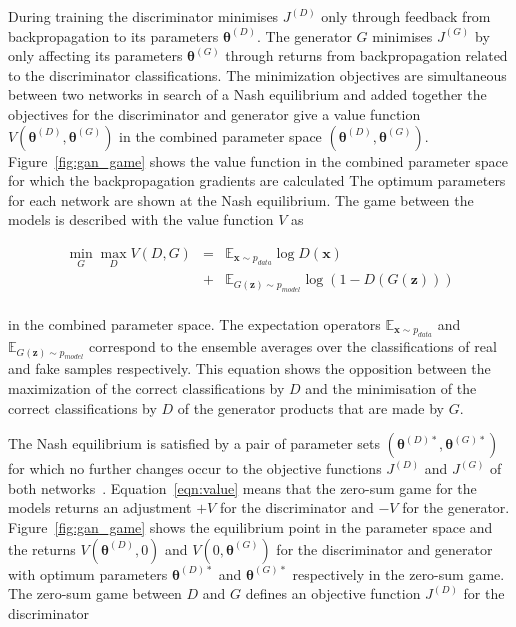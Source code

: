 \documentclass[twocolumn]{article}
\numberwithin{equation}{section}
\begin{document}
During training the discriminator minimises $J^{(D)}$ only through feedback from backpropagation to its parameters 
$\bm{\theta}^{(D)}$. The generator $G$ minimises $J^{(G)}$ by only affecting its parameters $\bm{\theta}^{(G)}$ through 
returns from backpropagation related to the discriminator classifications. The minimization objectives are simultaneous 
between two networks in search of a Nash equilibrium and added together the objectives for the discriminator and generator 
give a value function $V(\bm{\theta}^{(D)}, \bm{\theta}^{(G)})$ in the combined parameter space $(\bm{\theta}^{(D)}, 
\bm{\theta}^{(G)})$. Figure~\ref{fig:gan_game} shows the value function in the combined parameter space for which the 
backpropagation gradients are calculated 
The optimum parameters for each 
network are shown at the Nash equilibrium. The game between the models is described with the value function $V$ as 

\begin{eqnarray}\label{eqn:value}
    \min_G \max_D V(D,G) &=& \mathbb{E}_{\mathbf{x}\sim p_{data}}\log D(\mathbf{x})            \nonumber \\
                         &+& \mathbb{E}_{G(\mathbf{z}) \sim p_{model}}\log(1-D(G(\mathbf{z}))) \nonumber \\
\end{eqnarray}

in the combined parameter space. The expectation operators 
$\mathbb{E}_{\mathbf{x} \sim p_{data}}$ and $\mathbb{E}_{G(\mathbf{z}) \sim p_{model}}$ correspond to the ensemble 
averages over the classifications of real and fake samples respectively. This equation shows the opposition between 
the maximization of the correct classifications by $D$ and the minimisation of the correct classifications by $D$ of 
the generator products that are made by $G$. 

The Nash equilibrium is satisfied by a pair of parameter sets $(\bm{\theta}^{(D)*}, \bm{\theta}^{(G)*})$ for which 
no further changes occur to the objective functions $J^{(D)}$ and $J^{(G)}$ of both networks~\cite{NIPS16}. 
Equation~\ref{eqn:value} means that the zero-sum game for the models returns an adjustment $+V$ for the discriminator 
and $-V$ for the generator. Figure~\ref{fig:gan_game} shows the equilibrium point in the parameter space and the 
returns $V(\bm{\theta}^{(D)}, 0)$ and $V(0, \bm{\theta}^{(G)})$ for the discriminator and generator with optimum 
parameters $\bm{\theta}^{(D)*}$ and $\bm{\theta}^{(G)*}$ respectively in the zero-sum game. The zero-sum game between 
$D$ and $G$ defines an objective function $J^{(D)}$ for the discriminator
\end{document}
